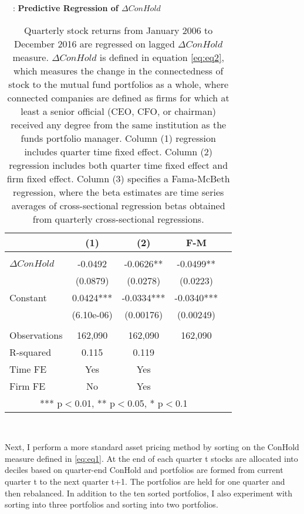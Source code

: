 \documentclass[11pt]{article}
\begin{document}
\begin{doublespace}
\begin{table} 
\centering
\caption{ \ \ : \large \bf  Predictive Regression of $\Delta ConHold$}
\vspace*{5mm}
\begin{tabular}{lcccc} \hline
 & (1) & (2) & F-M  \\ \hline
 &  &  &  &  \\
$\Delta ConHold$ & -0.0492 & -0.0626** & -0.0499** \\
 & (0.0879)  & (0.0278) & (0.0223) \\
Constant & 0.0424*** & -0.0334*** & -0.0340*** \\
 & (6.10e-06) & (0.00176) & (0.00249) \\
 &  &  &  &  \\
Observations & 162,090  & 162,090 & 162,090 \\
R-squared & 0.115  & 0.119 &  \\ 
Time FE & Yes & Yes &  \\
Firm FE & No & Yes &  \\ \hline
\multicolumn{4}{c}{ *** p$<$0.01, ** p$<$0.05, * p$<$0.1} \\
\end{tabular}
\label{table:reg}
\\
\vspace*{5mm}
\caption*{Quarterly stock returns from January 2006 to December 2016 are regressed on lagged $\Delta ConHold$ measure. $\Delta ConHold$ is defined in equation \ref{eq:eq2}, which measures the change in the connectedness of stock to the mutual fund portfolios as a whole, where connected companies are defined as firms for which at least a senior official (CEO, CFO, or chairman) received any degree from the same institution as the funds portfolio manager. Column (1) regression includes quarter time fixed effect. Column (2) regression includes both quarter time fixed effect and firm fixed effect. Column (3) specifies a Fama-McBeth regression, where the beta estimates are time series averages of cross-sectional regression betas obtained from quarterly cross-sectional regressions.}
\end{table}



Next, I perform a more standard asset pricing method by sorting on the ConHold measure defined in \ref{eq:eq1}. At the end of each quarter t stocks are allocated into deciles based on quarter-end ConHold and 
portfolios are formed from current quarter t to the next quarter t+1. 
The portfolios are held for one quarter and then rebalanced. In addition to the ten sorted portfolios, I also experiment with sorting into three portfolios and sorting into two portfolios. 


\end{doublespace}
\end{document}
